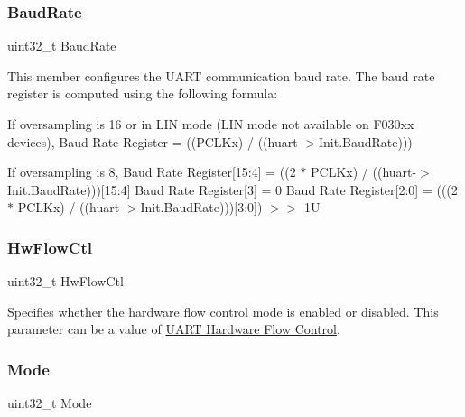 \subsubsection{\texorpdfstring{Baud\+Rate}{BaudRate}}
{\footnotesize\ttfamily uint32\+\_\+t Baud\+Rate}

This member configures the U\+A\+RT communication baud rate. The baud rate register is computed using the following formula\+:
\begin{DoxyItemize}
\item If oversampling is 16 or in L\+IN mode (L\+IN mode not available on F030xx devices), Baud Rate Register = ((P\+C\+L\+Kx) / ((huart-\/$>$Init.\+Baud\+Rate)))
\item If oversampling is 8, Baud Rate Register\mbox{[}15\+:4\mbox{]} = ((2 $\ast$ P\+C\+L\+Kx) / ((huart-\/$>$Init.\+Baud\+Rate)))\mbox{[}15\+:4\mbox{]} Baud Rate Register\mbox{[}3\mbox{]} = 0 Baud Rate Register\mbox{[}2\+:0\mbox{]} = (((2 $\ast$ P\+C\+L\+Kx) / ((huart-\/$>$Init.\+Baud\+Rate)))\mbox{[}3\+:0\mbox{]}) $>$$>$ 1U 
\end{DoxyItemize}\mbox{\label{struct_u_a_r_t___init_type_def_a0a933d213b17470c582c8fec23a24d09}} 
\subsubsection{\texorpdfstring{Hw\+Flow\+Ctl}{HwFlowCtl}}
{\footnotesize\ttfamily uint32\+\_\+t Hw\+Flow\+Ctl}

Specifies whether the hardware flow control mode is enabled or disabled. This parameter can be a value of \hyperlink{group___u_a_r_t___hardware___flow___control}{U\+A\+RT Hardware Flow Control}. \mbox{\label{struct_u_a_r_t___init_type_def_a0ffc93ec511ed9cf1663f6939bd3e839}} 
\subsubsection{\texorpdfstring{Mode}{Mode}}
{\footnotesize\ttfamily uint32\+\_\+t Mode}

